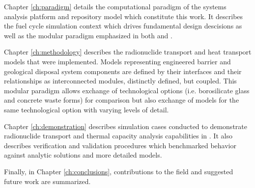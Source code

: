 Chapter \ref{ch:paradigm} details the computational paradigm of the \Cyclus 
systems analysis platform and \Cyder repository model which constitute this work. 
It describes the \Cyclus fuel cycle simulation context which drives fundamental 
\Cyder design descisions as well as the modular paradigm emphasized in both 
\Cyclus and \Cyder. 


Chapter \ref{ch:methodology} describes the radionuclide transport and heat 
transport models that were implemented. Models representing engineered barrier 
and geological disposal system components are defined by their interfaces and 
their relationships as interconnected modules, distinctly defined, but coupled. 
This modular paradigm allows exchange  of technological options (i.e. 
borosilicate glass and concrete waste forms) for comparison but also exchange of 
models for the same technological option with varying levels of detail.  


Chapter \ref{ch:demonstration} describes simulation cases conducted to 
demonstrate radionuclide transport and thermal capacity analysis capabilities in \Cyder. It 
also describes verification and validation procedures which benchmarked \Cyder 
behavior against analytic solutions and more detailed models.


Finally, in Chapter \ref{ch:conclusions}, contributions to the field and 
suggested future work are summarized. 




